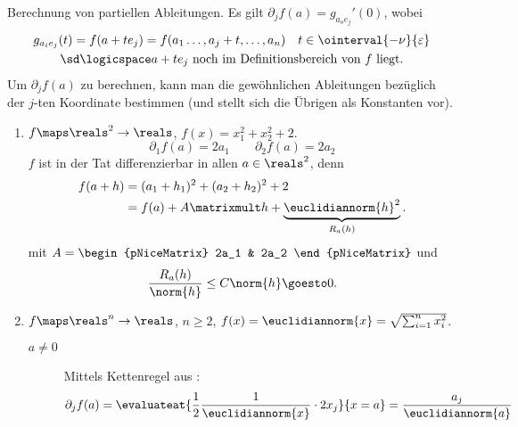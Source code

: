 \begin{bemerkung}
    Berechnung von partiellen Ableitungen. Es gilt \( \partial_j f(a)=g_{a_o e_j}'(0) \), wobei
    \begin{multline*}
        g_{a_i e_j}(t)=f(a+t e_j)=f(a_1\dotsc, a_j+t, \dotsc,a_n)\quad t\in \ointerval{-\nu}{\varepsilon} \\\text{\sd} \logicspace  a+te_{j} \ \text{noch im Definitionsbereich von \( f \) liegt.}
    \end{multline*}
    \timplies Um \( \partial_j f(a) \) zu berechnen, kann man die gewöhnlichen Ableitungen bezüglich der \( j \)-ten Koordinate bestimmen (und stellt sich die Übrigen als Konstanten vor).
\end{bemerkung}
\begin{beispiele}
    \begin{enumerate}
        \item \( f\maps \reals^2\to \reals \), \( f(x)=x_1^2+x_2^2+2 \).
        \begin{equation*}
            \partial_1 f(a)=2a_1\qquad \partial_2 f(a)=2a_2
        \end{equation*}
        \( f \) ist in der Tat differenzierbar in allen \( a\in \reals^2 \), denn
        \begin{equation*}
            \begin{split}
                f(a+h)&=(a_1+h_1)^2+(a_2+h_2)^2+2\\
                &=f(a)+A\matrixmult h+\underbrace{\euclidiannorm{h}^2}_{R_a(h)}.
            \end{split}
        \end{equation*}
        mit \( A=\begin{pNiceMatrix} 2a_1 & 2a_2 \end{pNiceMatrix} \) und
        \begin{align*}
            \frac{R_a(h)}{\norm{h}}\leq C\norm{h}\goesto 0.
        \end{align*}
        \item \( f\maps \reals^n \to \reals\), \( n\geq 2 \), \( f(x)=\euclidiannorm{x}=\sqrt{\sum_{i=1}^{n}x_i^2} \).
        \begin{description}
            \item[\( a\neq 0 \)] Mittels Kettenregel aus :
            \begin{align*}
                \partial_j f(a)=\evaluateat{\frac{1}{2}\frac{1}{\euclidiannorm{x}}\cdot 2x_j}{x=a}=\frac{a_j}{\euclidiannorm{a}}
            \end{align*}

\end{description}
\end{enumerate}
\end{beispiele}
